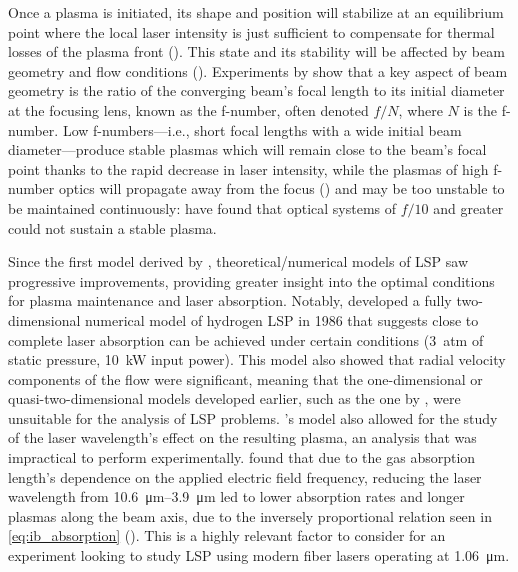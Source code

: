         Once a plasma is initiated, its shape and position will stabilize at an equilibrium point where the local laser intensity is just sufficient to compensate for thermal losses of the plasma front (\textcite{keeferLaserSustainedPlasmas1989}). This state and its stability will be affected by beam geometry and flow conditions (\textcite{welleEnergyConversionEfficiency1986}). Experiments by \textcite{fowlerIgnitionMaintenanceSubsonic1975} show that a key aspect of beam geometry is the ratio of the converging beam's focal length to its initial diameter at the focusing lens, known as the f-number, often denoted $f/N$, where $N$ is the f-number. Low f-numbers---i.e., short focal lengths with a wide initial beam diameter---produce stable plasmas which will remain close to the beam's focal point thanks to the rapid decrease in laser intensity, while the plasmas of high f-number optics will propagate away from the focus (\textcite{keeferLaserSustainedPlasmas1989}) and may be too unstable to be maintained continuously: \citeauthor{fowlerIgnitionMaintenanceSubsonic1975} have found that optical systems of $f/10$ and greater could not sustain a stable plasma.

        Since the first model derived by \citeauthor{raizerSUBSONICPROPAGATIONLIGHT1970}, theoretical/numerical models of LSP saw progressive improvements, providing greater insight into the optimal conditions for plasma maintenance and laser absorption. Notably, \textcite{jengNumericalStudyLasersustained1986} developed a fully two-dimensional numerical model of hydrogen LSP in 1986 that suggests close to complete laser absorption can be achieved under certain conditions (3~atm of static pressure, 10~kW input power). This model also showed that radial velocity components of the flow were significant, meaning that the one-dimensional or quasi-two-dimensional models developed earlier, such as the one by \textcite{battehTwoDimensionalGeneralization1974}, were unsuitable for the analysis of LSP problems. \citeauthor{jengNumericalStudyLasersustained1986}'s model also allowed for the study of the laser wavelength's effect on the resulting plasma, an analysis that was impractical to perform experimentally. \citeauthor{jengNumericalStudyLasersustained1986} found that due to the gas absorption length's dependence on the applied electric field frequency, reducing the laser wavelength from \qtyrange{10.6}{3.9}{\um} led to lower absorption rates and longer plasmas along the beam axis, due to the inversely proportional relation seen in \autoref{eq:ib_absorption} (\textcite{keeferLaserSustainedPlasmas1989}). This is a highly relevant factor to consider for an experiment looking to study LSP using modern fiber lasers operating at \qty{1.06}{\um}.

